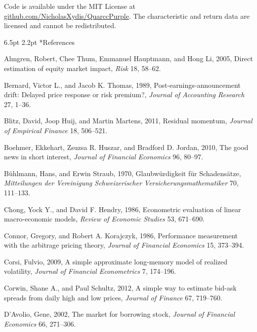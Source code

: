 \documentclass[10pt,twocolumn,letterpaper]{article}
\makeatletter
\renewcommand{\section}{\@startsection{section}{1}{\z@}%
  {6.5pt \@plus 2pt \@minus 1pt}%
  {2.2pt}%
  {\normalfont\normalsize\bfseries}}
\makeatother
\begin{document}
Code is available under the MIT License at \href{https://github.com/NicholasXydis/QuarccPurple}{github.com/NicholasXydis/QuarccPurple}. The characteristic and return data are licensed and cannot be redistributed.

\vspace{3pt}
\section*{References}
\scriptsize
\begin{list}{}{\setlength{\leftmargin}{1.3em}\setlength{\itemindent}{-1.3em}\setlength{\itemsep}{1.0pt}\setlength{\parsep}{0pt}}
\item Almgren, Robert, Chee Thum, Emmanuel Hauptmann, and Hong Li, 2005, Direct estimation of equity market impact, \textit{Risk} 18, 58--62.
\item Bernard, Victor L., and Jacob K. Thomas, 1989, Post-earnings-announcement drift: Delayed price response or risk premium?, \textit{Journal of Accounting Research} 27, 1--36.
\item Blitz, David, Joop Huij, and Martin Martens, 2011, Residual momentum, \textit{Journal of Empirical Finance} 18, 506--521.
\item Boehmer, Ekkehart, Zsuzsa R. Huszar, and Bradford D. Jordan, 2010, The good news in short interest, \textit{Journal of Financial Economics} 96, 80--97.
\item B\"uhlmann, Hans, and Erwin Straub, 1970, Glaubw\"urdigkeit f\"ur Schadens\"atze, \textit{Mitteilungen der Vereinigung Schweizerischer Versicherungsmathematiker} 70, 111--133.
\item Chong, Yock Y., and David F. Hendry, 1986, Econometric evaluation of linear macro-economic models, \textit{Review of Economic Studies} 53, 671--690.
\item Connor, Gregory, and Robert A. Korajczyk, 1986, Performance measurement with the arbitrage pricing theory, \textit{Journal of Financial Economics} 15, 373--394.
\item Corsi, Fulvio, 2009, A simple approximate long-memory model of realized volatility, \textit{Journal of Financial Econometrics} 7, 174--196.
\item Corwin, Shane A., and Paul Schultz, 2012, A simple way to estimate bid-ask spreads from daily high and low prices, \textit{Journal of Finance} 67, 719--760.
\item D'Avolio, Gene, 2002, The market for borrowing stock, \textit{Journal of Financial Economics} 66, 271--306.

\end{list}
\end{document}
